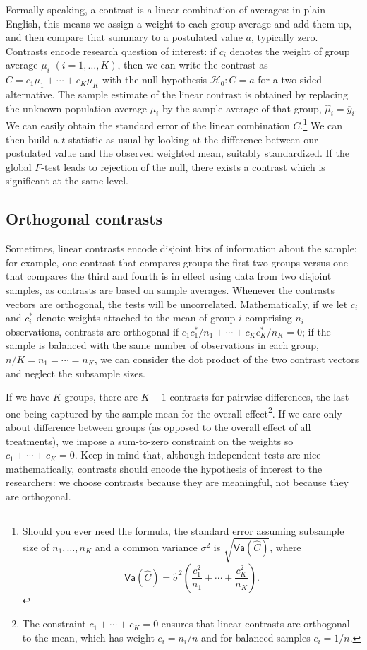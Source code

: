 \documentclass[
  11pt,
  letterpaper,
]{scrbook}
\theoremstyle{definition}
\theoremstyle{remark}
\begin{document}
Formally speaking, a contrast is a linear combination of averages: in
plain English, this means we assign a weight to each group average and
add them up, and then compare that summary to a postulated value \(a\),
typically zero. Contrasts encode research question of interest: if
\(c_i\) denotes the weight of group average \(\mu_i\)
\((i=1, \ldots, K)\), then we can write the contrast as
\(C = c_1 \mu_1 + \cdots + c_K \mu_K\) with the null hypothesis
\(\mathscr{H}_0: C=a\) for a two-sided alternative. The sample estimate
of the linear contrast is obtained by replacing the unknown population
average \(\mu_i\) by the sample average of that group,
\(\widehat{\mu}_i = \overline{y}_{i}\). We can easily obtain the
standard error of the linear combination \(C\).\footnote{Should you ever
  need the formula, the standard error assuming subsample size of
  \(n_1, \ldots, n_K\) and a common variance \(\sigma^2\) is
  \(\sqrt{\mathsf{Va}(\widehat{C})}\), where
  \[\mathsf{Va}(\widehat{C}) = \widehat{\sigma}^2\left(\frac{c_1^2}{n_1} + \cdots + \frac{c_K^2}{n_K}\right).\]}
We can then build a \(t\) statistic as usual by looking at the
difference between our postulated value and the observed weighted mean,
suitably standardized. If the global \(F\)-test leads to rejection of
the null, there exists a contrast which is significant at the same
level.

\hypertarget{orthogonal-contrasts}{%
\subsection{Orthogonal contrasts}\label{orthogonal-contrasts}}

Sometimes, linear contrasts encode disjoint bits of information about
the sample: for example, one contrast that compares groups the first two
groups versus one that compares the third and fourth is in effect using
data from two disjoint samples, as contrasts are based on sample
averages. Whenever the contrasts vectors are orthogonal, the tests will
be uncorrelated. Mathematically, if we let \(c_{i}\) and \(c^{*}_{i}\)
denote weights attached to the mean of group \(i\) comprising \(n_i\)
observations, contrasts are orthogonal if
\(c_{1}c^{*}_{1}/n_1 + \cdots + c_{K}c^{*}_K/n_K = 0\); if the sample is
balanced with the same number of observations in each group,
\(n/K = n_1 =\cdots = n_K\), we can consider the dot product of the two
contrast vectors and neglect the subsample sizes.

If we have \(K\) groups, there are \(K-1\) contrasts for pairwise
differences, the last one being captured by the sample mean for the
overall effect\footnote{The constraint \(c_1 + \cdots + c_K=0\) ensures
  that linear contrasts are orthogonal to the mean, which has weight
  \(c_i=n_i/n\) and for balanced samples \(c_i =1/n\).}. If we care only
about difference between groups (as opposed to the overall effect of all
treatments), we impose a sum-to-zero constraint on the weights so
\(c_1 + \cdots + c_K=0\). Keep in mind that, although independent tests
are nice mathematically, contrasts should encode the hypothesis of
interest to the researchers: we choose contrasts because they are
meaningful, not because they are orthogonal.
\end{document}
